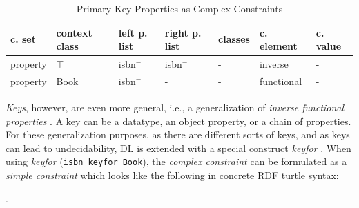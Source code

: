 \documentclass[a4paper,fontsize=11pt]{scrartcl}
\newcommand{\ms}[1]{\texttt{#1}}
\begin{document}
\begin{table}[H]
  \scriptsize
  \sffamily
  \vspace{0cm}
	\caption{Primary Key Properties as Complex Constraints}
	\label{tab:primary-key-properties-as-complex-constraints}
	\centering
		\begin{tabular}{l|l|l|l|l|l|l}
      \textbf{c. set} & \textbf{context class} & \textbf{left p. list} & \textbf{right p. list} & \textbf{classes} & \textbf{c. element} & \textbf{c. value} \\
      \hline
property & $\top$ & isbn$^{-}$ & isbn$^{-}$ & - & inverse & - \\
property & Book & isbn$^{-}$ & - & - & functional & - \\
		\end{tabular}
\end{table}

\emph{Keys}, however, are even more general, i.e., a generalization of \emph{inverse functional properties} \cite{Schneider2009}.
A key can be a datatype, an object property, or a chain of properties.
For these generalization purposes, as there are different sorts of keys, and as keys can lead to undecidability, 
DL is extended with a special construct \emph{keyfor} \cite{Lutz2005}.
When using \emph{keyfor} (\ms{isbn keyfor Book}), 
the \emph{complex constraint} can be formulated as a \emph{simple constraint} which looks like the following in concrete RDF turtle syntax:



\begin{ex} .
\end{ex}
\end{document}
